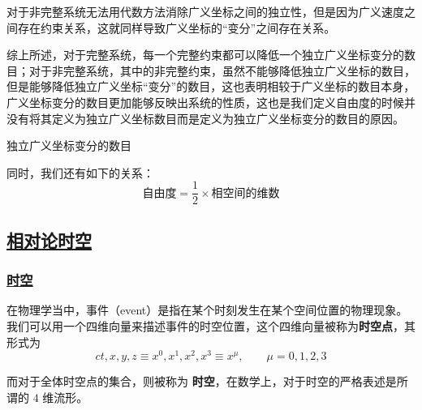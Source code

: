 对于非完整系统无法用代数方法消除广义坐标之间的独立性，但是因为广义速度之间存在约束关系，这就同样导致广义坐标的“变分”之间存在关系。

综上所述，对于完整系统，每一个完整约束都可以降低一个独立广义坐标变分的数目；对于非完整系统，其中的非完整约束，虽然不能够降低独立广义坐标的数目，但是能够降低独立广义坐标“变分”的数目，这也表明相较于广义坐标的数目本身，广义坐标变分的数目更加能够反映出系统的性质，这也是我们定义自由度的时候并没有将其定义为独立广义坐标数目而是定义为独立广义坐标变分的数目的原因。

\begin{definition}[自由度]
    独立广义坐标变分的数目
\end{definition}

同时，我们还有如下的关系：
\begin{equation}
    \text{自由度} = \frac{1}{2} \times \text{相空间的维数}
\end{equation}





\subsection{\protect\hyperlink{:}{相对论时空}}

\subsubsection{\protect\hyperlink{:}{时空}}
在物理学当中，事件（event）是指在某个时刻发生在某个空间位置的物理现象。我们可以用一个四维向量来描述事件的时空位置，这个四维向量被称为\textbf{时空点}，其形式为
\begin{equation}
    {ct, x, y, z} \equiv {x^0,x^1,x^2,x^3} \equiv {x^\mu} ,\qquad \mu = 0,1,2,3
\end{equation}

而对于全体时空点的集合，则被称为 \textbf{时空}，在数学上，对于时空的严格表述是所谓的 $4$ 维流形。


